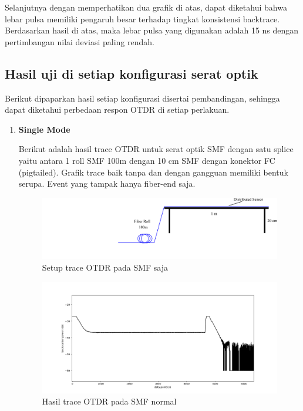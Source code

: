 \documentclass[12pt]{article}
\begin{document}
	Selanjutnya dengan memperhatikan dua grafik di atas, dapat diketahui bahwa lebar pulsa memiliki pengaruh besar terhadap tingkat konsistensi backtrace.
	Berdasarkan hasil di atas, maka lebar pulsa yang digunakan adalah 15 ns dengan pertimbangan nilai deviasi paling rendah.
	
	\subsection{Hasil uji di setiap konfigurasi serat optik}
	
	Berikut dipaparkan hasil setiap konfigurasi disertai pembandingan, sehingga dapat diketahui perbedaan respon OTDR di setiap perlakuan.
	
	\begin{enumerate}
		\item \textbf{Single Mode}

		Berikut adalah hasil trace OTDR untuk serat optik SMF dengan satu splice yaitu antara 1 roll SMF 100m dengan 10 cm SMF dengan konektor FC (pigtailed).
		Grafik trace baik tanpa dan dengan gangguan memiliki bentuk serupa.
		Event yang tampak hanya fiber-end saja.
		 
		
		\begin{figure}[!h]
			\centering
			\captionsetup{justification=centering}
			\includegraphics[width=\linewidth]{images/Bab_4/Bab_4_3a0}
			\caption[Trace SMF]{\small{Setup trace OTDR pada SMF saja}}
		\end{figure}
		
		\begin{figure}[!h]
			\centering
			\captionsetup{justification=centering}
			\includegraphics[width=\linewidth]{images/Bab_4/Bab_4_3a1}
			\caption[Trace SMF]{\small{Hasil trace OTDR pada SMF normal}}
		\end{figure}
		

\end{enumerate}
\end{document}
